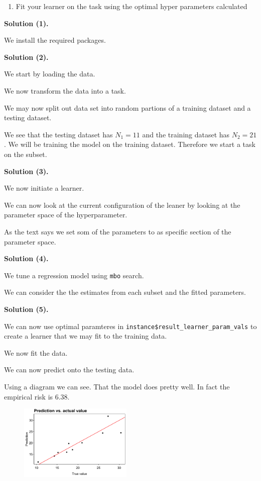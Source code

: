 \documentclass[
]{book}
\providecommand{\tightlist}{%
  \setlength{\itemsep}{0pt}\setlength{\parskip}{0pt}}
\begin{document}
\begin{enumerate}
\def\labelenumi{\arabic{enumi}.}
\setcounter{enumi}{4}
\tightlist
\item
  Fit your learner on the task using the optimal hyper parameters calculated
\end{enumerate}

\textbf{Solution (1).}

We install the required packages.

\textbf{Solution (2).}

We start by loading the data.

We now transform the data into a task.

We may now split out data set into random partions of a training dataset and a testing dataset.

We see that the testing dataset has \(N_1=11\) and the training dataset has \(N_2=21\). We will be training the model on the training dataset. Therefore we start a task on the subset.

\textbf{Solution (3).}

We now initiate a learner.

We can now look at the current configuration of the leaner by looking at the parameter space of the hyperparameter.

As the text says we set som of the parameters to as specific section of the parameter space.

\textbf{Solution (4).}

We tune a regression model using \texttt{mbo} search.

We can consider the the estimates from each subset and the fitted parameters.

\textbf{Solution (5).}

We can now use optimal paramteres in \texttt{instance\$result\_learner\_param\_vals} to create a learner that we may fit to the training data.

We now fit the data.

We can now predict onto the testing data.

Using a diagram we can see. That the model does pretty well. In fact the empirical risk is 6.38.

\begin{figure}[H]
  \begin{center}
    \includegraphics[width=0.48\textwidth]{figures/ML_week1_ex4.png}
  \end{center}
\end{figure}
\end{document}
